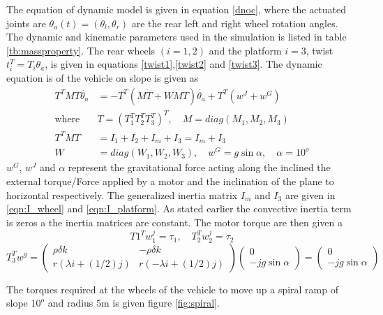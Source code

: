 The equation of  dynamic model  is given in equation \ref{dnoc}, where the actuated joints are  $\theta_a(t)=(\theta_l, \theta_r) $ are the rear left and right wheel rotation angles. The dynamic  and kinematic  parameters used in the simulation is listed in table \ref{tb:massproperty}. The rear wheels $(i=1,2)$ and the platform $i=3$, twist $t_i^T=T_i\theta_a$, is given in equations \ref{twist1},\ref{twist2} and \ref{twist3}. The dynamic equation is of the vehicle on slope is given as 
\begin{equation}
\label{dnoc}
\begin{aligned}
T^TMT\ddot{\theta_a}&=-T^T(M\dot{T}+WMT)\dot{\theta_a}+T^T(w^J+w^G)\\
\text{where} \quad &
T=(T_1^T T_2^T T_3^T)^T, \quad M=diag(M_1, M_2, M_3)\\
T^TMT &=I_1+I_2+I_m+I_3= I_m+I_3\\
W&=diag(W_1,W_2,W_3),\quad w^G=g\sin\alpha, \quad \alpha=10^o
\end{aligned}
\end{equation}
$w^G$, $ w^J$ and $\alpha$ represent the gravitational force acting along the inclined  the external torque/Force applied by a motor and the inclination of the plane to horizontal respectively. The generalized inertia matrix $I_m$ and $I_3$ are given in \ref{eqn:I_wheel} and \ref{eqn:I_platform}.
As stated earlier the convective inertia term is zeros a the inertia matrices are constant. The motor torque  are then given a 
\begin{equation}
T1^Tw_1^j=\tau_1, \quad T_2^Tw_2^j=\tau_2
\end{equation}
\begin{equation}
 T_3^Tw^g=\begin{pmatrix}
\rho\delta k & -\rho\delta k\\
r(\lambda i+(1/2)j) & r(-\lambda i+(1/2)j)
\end{pmatrix}
\begin{pmatrix}
0\\
-jg\sin\alpha
\end{pmatrix}=\begin{pmatrix}
0\\ -jg\sin\alpha
\end{pmatrix}
\end{equation} 

The torques required at the wheels of the vehicle to  move up a spiral ramp  of slope $10^o$ and radius 5m is given figure \ref{fig:spiral}. 


